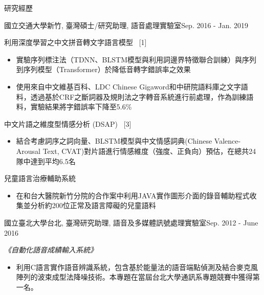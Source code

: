 \documentclass{resume} %
\begin{document}
\begin{rSection}{研究經歷}
    \begin{rSubsection}{國立交通大學}{新竹, 臺灣}{碩士/研究助理, 語音處理實驗室}{Sep. 2016 - Jan. 2019}
        \item 利用深度學習之中文拼音轉文字語言模型 ~[1]
        \begin{itemize}[label=$-$]
            \setlength \itemsep{-0.5em}
            \item 實驗序列標注法（TDNN、BLSTM模型與利用詞邊界特徵聯合訓練）與序列到序列模型（Transformer）於降低音轉字錯誤率之效果
            \item 使用來自中文維基百科、LDC Chinese Gigaword和中研院語料庫之文字語料，透過基於CRF之斷詞器及規則法之字轉音系統進行前處理，作為訓練語料，實驗結果將字錯誤率下降至5.6\%
        \end{itemize}\vspace {0.5em}
        \item 中文片語之維度型情感分析 (DSAP) ~[3] 
        \begin{itemize}[label=$-$]
            \setlength \itemsep{-0.5em}
            \item 結合考慮詞序之詞向量、BLSTM模型與中文情感詞典(Chinese Valence-Arousal Text, CVAT)對片語進行情感維度（強度、正負向）預估，在總共24隊中達到平均6.5名
        \end{itemize}\vspace {0.5em}
        \item 兒童語言治療輔助系統
        \begin{itemize}[label=$-$]
            \setlength \itemsep{-0.5em}
            \item 在和台大醫院新竹分院的合作案中利用JAVA實作圖形介面的錄音輔助程式收集並分析約200位正常及語言障礙的兒童語料
        \end{itemize}\vspace {0.5em}
    \end{rSubsection}
    \begin{rSubsection}{國立臺北大學}{台北, 臺灣}{研究助理, 語音及多媒體訊號處理實驗室}{Sep. 2012 - June 2016}
        \item {\em 《自動化語音成績輸入系統》}
        \begin{itemize}[label=$-$]
            \setlength \itemsep{-0.5em}
            \item 利用C語言實作語音辨識系統，包含基於能量法的語音端點偵測及結合麥克風陣列的波束成型法降噪技術。本專題在當屆台北大學通訊系專題競賽中獲得第一名。

\end{itemize}
\end{rSubsection}
\end{rSection}
\end{document}

